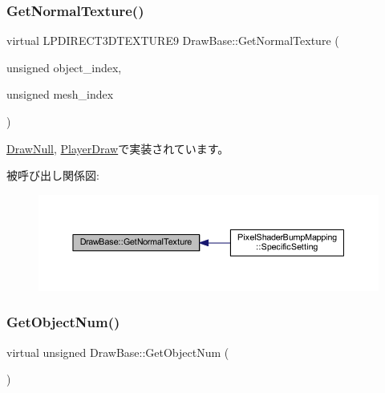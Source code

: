 \subsubsection{\texorpdfstring{Get\+Normal\+Texture()}{GetNormalTexture()}}
{\footnotesize\ttfamily virtual L\+P\+D\+I\+R\+E\+C\+T3\+D\+T\+E\+X\+T\+U\+R\+E9 Draw\+Base\+::\+Get\+Normal\+Texture (\begin{DoxyParamCaption}\item[{unsigned}]{object\+\_\+index,  }\item[{unsigned}]{mesh\+\_\+index }\end{DoxyParamCaption})\hspace{0.3cm}{\ttfamily [pure virtual]}}



\mbox{\hyperlink{class_draw_null_a41b7d148612b2d328e85289e32dc374c}{Draw\+Null}}, \mbox{\hyperlink{class_player_draw_abb93b530e38fc224ecbfe17d623f10fb}{Player\+Draw}}で実装されています。

被呼び出し関係図\+:\nopagebreak
\begin{figure}[H]
\begin{center}
\leavevmode
\includegraphics[width=350pt]{class_draw_base_a87bb54e7f422959e84ac00aa7631bd3b_icgraph}
\end{center}
\end{figure}
\mbox{\label{class_draw_base_aed79e9db49de4fa2dff064495b877bcd}} 
\subsubsection{\texorpdfstring{Get\+Object\+Num()}{GetObjectNum()}}
{\footnotesize\ttfamily virtual unsigned Draw\+Base\+::\+Get\+Object\+Num (\begin{DoxyParamCaption}{ }\end{DoxyParamCaption})\hspace{0.3cm}{\ttfamily [pure virtual]}}




